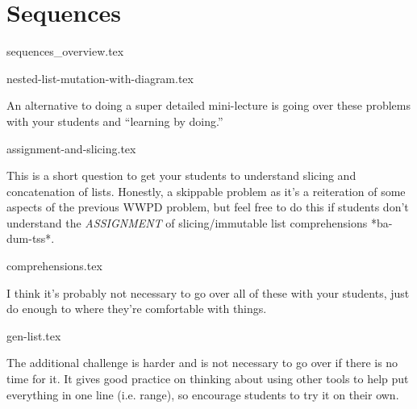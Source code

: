 \documentclass{exam}
\begin{document}
\section{Sequences}
{sequences_overview.tex}
\begin{questions}
    {nested-list-mutation-with-diagram.tex}
    \begin{questionmeta}
        An alternative to doing a super detailed mini-lecture is going over these problems with your students and ``learning by doing.'' 
    \end{questionmeta}
    \newpage
    {assignment-and-slicing.tex}
    \begin{questionmeta}
        This is a short question to get your students to understand slicing and concatenation of lists. Honestly, a skippable problem as it's a reiteration of some aspects of the previous WWPD problem, but feel free to do this if students don't understand the \textit{ASSIGNMENT} of slicing/immutable list comprehensions *ba-dum-tss*.
    \end{questionmeta}
    {comprehensions.tex}
    \begin{questionmeta}
        I think it's probably not necessary to go over all of these with your students, just do enough to where they're comfortable with things. 
    \end{questionmeta}
        \newpage
    {gen-list.tex}
    \begin{questionmeta}
        The additional challenge is harder and is not necessary to go over if there is no time for it. It gives good practice on thinking about using other tools to help put everything in one line (i.e. range), so encourage students to try it on their own.
    \end{questionmeta}
\end{questions}
    \newpage
\end{document}
